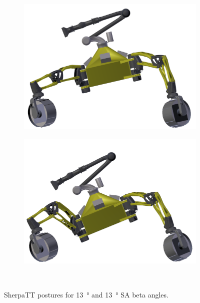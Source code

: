\begin{figure}[h]
\captionsetup[subfigure]{justification=centering}
\vspace{-2ex}
	\centering
    \setlength{\subfigureWidth}{0.50\textwidth}
    \setlength{\graphicsHeight}{55mm}
    \hypersetup{hidelinks=true}%
    \begin{subfigure}[t]{\subfigureWidth}
        \centering
        \includegraphics[height=\graphicsHeight]{sections/mission-sites/images/sherpatt-render-surface-beta-13-deg.png}
        \label{fig:sub:postures-sa-beta-13-degree}
    \end{subfigure}\hfill
    \begin{subfigure}[t]{\subfigureWidth}
        \centering
        \includegraphics[height=\graphicsHeight]{sections/mission-sites/images/sherpatt-render-surface-beta-22-deg.png}
		\label{fig:sub:postures-sa-beta-22-degree}
	\end{subfigure}\\[0.8ex]
    \caption[SherpaTT postures for \SI{13}{\degree} and \SI{13}{\degree} \ac{SA} beta angles]
            {SherpaTT postures for \SI{13}{\degree} and \SI{13}{\degree} \ac{SA} beta angles.}
    \label{fig:postures-sa-beta}
\vspace{-2ex}
\end{figure}

